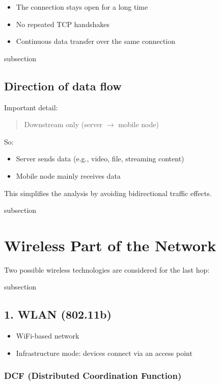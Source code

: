 \begin{itemize}
    \item The connection stays open for a long time
    \item No repeated TCP handshakes
    \item Continuous data transfer over the same connection
\end{itemize}

subsection

\subsection*{Direction of data flow}

Important detail:

\begin{quote}
Downstream only (server $\rightarrow$ mobile node)
\end{quote}

So:
\begin{itemize}
    \item Server sends data (e.g., video, file, streaming content)
    \item Mobile node mainly receives data
\end{itemize}

This simplifies the analysis by avoiding bidirectional traffic effects.

subsection

\section{Wireless Part of the Network}

Two possible wireless technologies are considered for the last hop:

subsection

\subsection{1. WLAN (802.11b)}

\begin{itemize}
    \item WiFi-based network
    \item Infrastructure mode: devices connect via an access point
\end{itemize}

\subsubsection*{DCF (Distributed Coordination Function)}

